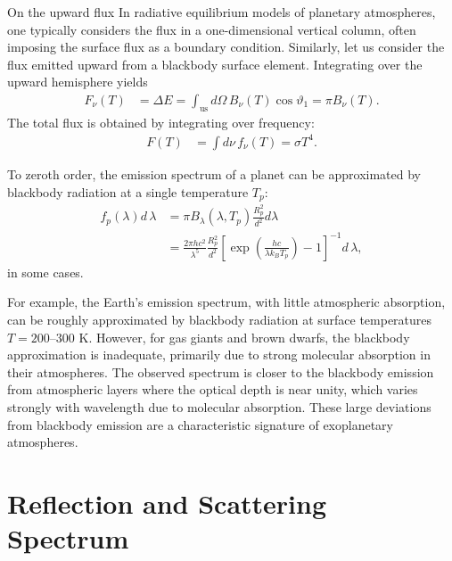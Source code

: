 \begin{itembox}{On the upward flux}
\footnotesize
\color{gray}
In radiative equilibrium models of planetary atmospheres, one typically considers the flux in a one-dimensional vertical column, often imposing the surface flux as a boundary condition. Similarly, let us consider the flux emitted upward from a blackbody surface element. Integrating over the upward hemisphere yields
\begin{align}
\label{eq:defsurf}
F_\nu (T) &= \Delta E = \int_\mathrm{us} d \Omega \, B_\nu (T) \cos{\vartheta_1} = \pi B_\nu (T).
\end{align}
The total flux is obtained by integrating over frequency:
\begin{align}
\label{eq:defsurflum}
F (T) &= \int d \nu \, f_\nu (T) = \sigma T^4.
\end{align}
\end{itembox}

To zeroth order, the emission spectrum of a planet can be approximated by blackbody radiation at a single temperature $T_p$:
\begin{align}
f_p (\lambda) d\, \lambda  &= \pi B_\lambda(\lambda,T_p) \frac{ R_p^2}{d^2}  d \lambda \\
&= \frac{2 \pi h c^2}{\lambda^5} \frac{ R_p^2}{d^2} \left[ \exp{ \left(\frac{h c}{\lambda k_B T_p} \right) }- 1 \right]^{-1} d\, \lambda ,
\label{eq:planckdist}
\end{align}
in some cases.

For example, the Earth's emission spectrum, with little atmospheric absorption, can be roughly approximated by blackbody radiation at surface temperatures $T=200$--$300$ K. However, for gas giants and brown dwarfs, the blackbody approximation is inadequate, primarily due to strong molecular absorption in their atmospheres. The observed spectrum is closer to the blackbody emission from atmospheric layers where the optical depth is near unity, which varies strongly with wavelength due to molecular absorption. These large deviations from blackbody emission are a characteristic signature of exoplanetary atmospheres.

\section{Reflection and Scattering Spectrum}

